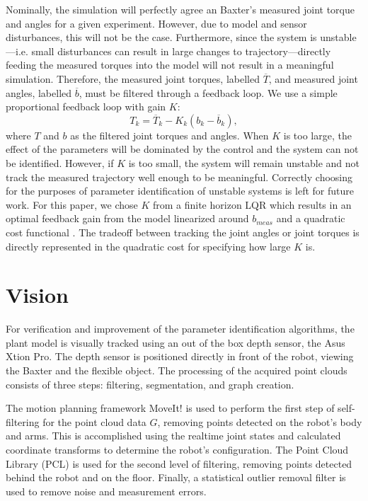 \documentclass[runningheads,a4paper]{llncs}
\begin{document}
Nominally, the simulation will perfectly agree an Baxter's measured joint torque and angles for a given experiment. However, due to model and sensor disturbances, this will not be the case. Furthermore, since the system is unstable---i.e. small disturbances can result in large changes to trajectory---directly feeding the measured torques into the model will not result in a meaningful simulation. Therefore, the measured joint torques, labelled $\overline{T}$, and measured joint angles, labelled $\overline{b}$, must be filtered through a feedback loop. We use a simple proportional feedback loop with gain $K$: 
\[
T_k = \overline{T}_k - K_k (b_k - \overline{b}_k),
\]
where $T$ and $b$ as the filtered joint torques and angles.  When $K$ is too large, the effect of the parameters will be dominated by the control and the system can not be identified. However, if $K$ is too small, the system will remain unstable and not track the measured trajectory well enough to be meaningful.  Correctly choosing for the purposes of parameter identification of unstable systems is left for future work.  For this paper, we chose $K$ from a finite horizon LQR which results in an optimal feedback gain from the model linearized around $b_{meas}$ and a quadratic cost functional \cite{anderson_moore}.  The tradeoff between tracking the joint angles or joint torques is directly represented in the quadratic cost for specifying how large $K$ is.


\section{Vision}

For verification and improvement of the parameter identification algorithms, the plant model is visually tracked using an out of the box depth sensor, the Asus Xtion Pro. The depth sensor is positioned directly in front of the robot, viewing the Baxter and the flexible object. The processing of the acquired point clouds consists of three steps: filtering, segmentation, and graph creation. 

The motion planning framework MoveIt! \cite{moveit} is used to perform the first step of self-filtering for the point cloud data $G$, removing points detected on the robot’s body and arms. This is accomplished using the realtime joint states and calculated coordinate transforms to determine the robot’s configuration. The Point Cloud Library (PCL) \cite{rusu20113d} is used for the second level of filtering, removing points detected behind the robot and on the floor. Finally, a statistical outlier removal filter is used to remove noise and measurement errors.
\end{document}

